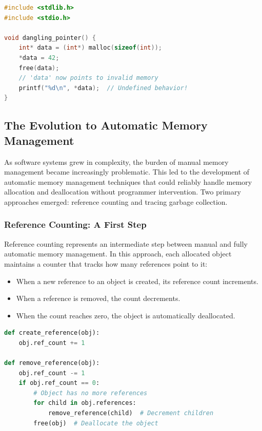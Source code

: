 \begin{lstlisting}[language=C, caption=Dangling Pointer Example, style=mystyle]
#include <stdlib.h>
#include <stdio.h>

void dangling_pointer() {
    int* data = (int*) malloc(sizeof(int));
    *data = 42;
    free(data);
    // 'data' now points to invalid memory
    printf("%d\n", *data);  // Undefined behavior!
}
\end{lstlisting}

\subsection{The Evolution to Automatic Memory Management}

As software systems grew in complexity, the burden of manual memory management became increasingly problematic. This led to the development of automatic memory management techniques that could reliably handle memory allocation and deallocation without programmer intervention. Two primary approaches emerged: reference counting and tracing garbage collection.

\subsubsection{Reference Counting: A First Step}

Reference counting represents an intermediate step between manual and fully automatic memory management. In this approach, each allocated object maintains a counter that tracks how many references point to it:

\begin{itemize}
    \item When a new reference to an object is created, its reference count increments.
    \item When a reference is removed, the count decrements.
    \item When the count reaches zero, the object is automatically deallocated.
\end{itemize}

\begin{lstlisting}[language=Python, caption=Reference Counting Concept, style=pythonstyle]
def create_reference(obj):
    obj.ref_count += 1

def remove_reference(obj):
    obj.ref_count -= 1
    if obj.ref_count == 0:
        # Object has no more references
        for child in obj.references:
            remove_reference(child)  # Decrement children
        free(obj)  # Deallocate the object
\end{lstlisting}

